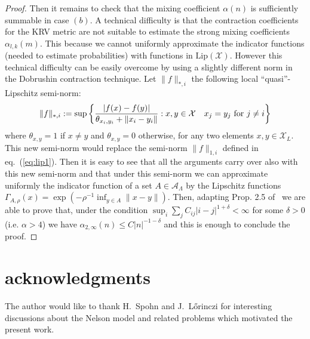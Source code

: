 \documentclass[a4paper,12pt,reqno]{amsart}
\newtheorem{remark}[theorem]{Remark}
\newcommand{\eps}{\varepsilon}
\newcommand{\R}{\mathbb{R}}
\newcommand{\A}{\mathcal{A}}
\newcommand{\X}{\mathcal{X}}
\begin{document}
\begin{proof}
Then it remains to check that the mixing coefficient $\alpha(n)$ is
sufficiently summable in case $(b)$. A technical difficulty is that the contraction coefficients for the KRV metric are not suitable to estimate the strong mixing coefficients $\alpha_{l,k}(m)$. This
because we cannot uniformly approximate the indicator functions (needed to estimate probabilities) with
functions in $\mathrm{Lip}(\X)$. However this technical difficulty can
be easily overcome by using a slightly different norm in the Dobrushin
contraction technique.
Let $\|f\|_{*,i}$ the following local ``quasi''-Lipschitz semi-norm:
\begin{equation*}
\|f\|_{*,i} :=  \sup \left\{ \frac{|f(x)-f(y)|}{\theta_{x_i,y_i}+\|x_i-y_i\|} :
 x,y \in\X  \quad \text{$ x_j=y_j$ for $j \neq i$} \right\}  
\end{equation*}
where $\theta_{x,y} = 1$ if $x \neq y$ and $\theta_{x,y} = 0$ otherwise,
for any two elements $x,y \in \X_L$.
This new semi-norm would replace the semi-norm $\|f\|_{1,i}$ defined in
eq.~(\ref{eq:lip1}). Then it is easy to see that all the arguments
carry over also with this new semi-norm and that under this semi-norm
we can approximate uniformly the indicator function of a set $A \in
\A_{\Lambda}$ by the Lipschitz functions
$\Gamma_{A,\rho}(x) = \exp(-\rho^{-1}\inf_{y \in A} \|x-y\|)$. 
Then, adapting Prop. 2.5 of~\cite{kuensch} we are able to prove that,
under the condition  $\sup_i \sum_{j} C_{ij} |i-j|^{1+\delta} <
\infty$ for some $\delta > 0$ (i.e. $\alpha > 4$) we have
$\alpha_{2,\infty}(n) \le C |n|^{-1-\delta}$ and this is enough to
conclude the proof.  
\end{proof}



 
\section*{acknowledgments}
  The author would like to thank H.~Spohn and J.~L\H{o}rinczi for
  interesting discussions about the Nelson model and related problems
  which motivated the present work.
\end{document}
